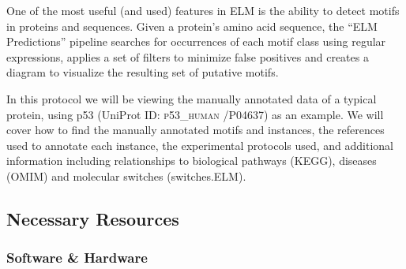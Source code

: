 \documentclass[12pt]{article}
\newcounter{proto}
\newcommand\uniprot[1]{%
	\textsc{\lowercase{#1}}%
}
\begin{document}
	One of the most useful (and used) features in ELM is the ability to
	detect motifs in proteins and sequences. Given a protein's amino acid
	sequence, the ``ELM Predictions'' pipeline searches for occurrences of
	each motif class using regular expressions, applies a set of filters to
	minimize false positives and creates a diagram to visualize the resulting
	set of putative motifs.

	In this protocol we will be viewing the manually annotated data of a
	typical protein, using p53 (UniProt ID: \uniprot{P53\_HUMAN}/P04637) as an
	example. We will cover how to find the manually annotated motifs and instances,
	the references used to annotate each
	instance, the experimental protocols used, and additional information including
	relationships to biological pathways (KEGG), diseases (OMIM) and molecular
	switches (switches.ELM).

	\subsection*{Necessary Resources}
	\subsubsection*{Software \& Hardware}
	
\end{document}
